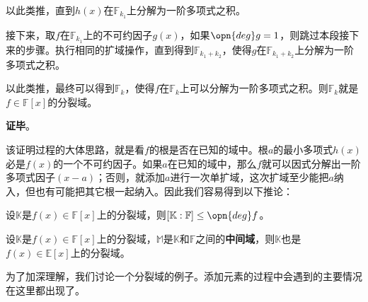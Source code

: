 以此类推，直到$h(x)$在$\mathbb{F}_{k_1}$上分解为一阶多项式之积。

接下来，取$f$在$\mathbb{F}_{k_1}$上的不可约因子$g(x)$，如果$\opn{deg} g = 1$，则跳过本段接下来的步骤。执行相同的扩域操作，直到得到$\mathbb{F}_{k_1+k_2}$，使得$g$在$\mathbb{F}_{k_1+k_2}$上分解为一阶多项式之积。

以此类推，最终可以得到$\mathbb{F}_k$，使得$f$在$\mathbb{F}_k$上可以分解为一阶多项式之积。则$\mathbb{F}_k$就是$f\in\mathbb{F}[x]$的分裂域。

\textbf{证毕}。

该证明过程的大体思路，就是看$f$的根是否在已知的域中。根$a$的最小多项式$h(x)$必是$f(x)$的一个不可约因子。如果$a$在已知的域中，那么$f$就可以因式分解出一阶多项式因子$(x-a)$；否则，就添加$a$进行一次单扩域，这次扩域至少能把$a$纳入，但也有可能把其它根一起纳入。因此我们容易得到以下推论：

\begin{corollary}{}
设$\mathbb{K}$是$f(x)\in \mathbb{F}[x]$上的分裂域，则$[\mathbb{K}:\mathbb{F}]\leq \opn{deg}f$。
\end{corollary}

\begin{corollary}{}
设$\mathbb{K}$是$f(x)\in \mathbb{F}[x]$上的分裂域，$\mathbb{M}$是$\mathbb{K}$和$\mathbb{F}$之间的\textbf{中间域}，则$\mathbb{K}$也是$f(x)\in \mathbb{E}[x]$上的分裂域。
\end{corollary}

为了加深理解，我们讨论一个分裂域的例子。添加元素的过程中会遇到的主要情况在这里都出现了。

